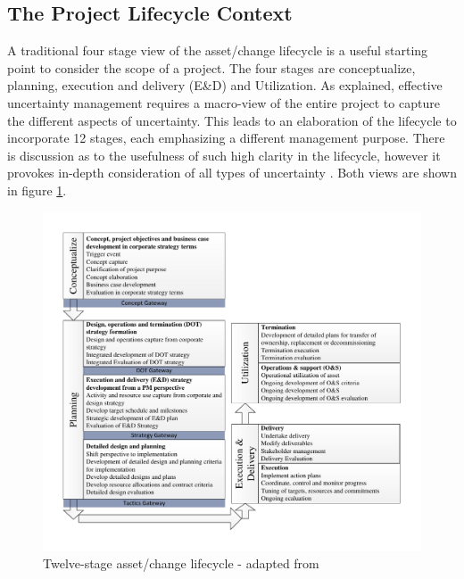 \subsection{The Project Lifecycle Context}
A traditional four stage view of the asset/change lifecycle is a useful starting point to consider the scope of a project.
The four stages are conceptualize, planning, execution and delivery (E\&D) and Utilization.
As explained, effective uncertainty management requires a macro-view of the entire project to capture the different aspects of uncertainty.
This leads to an elaboration of the lifecycle to incorporate 12 stages, each emphasizing a different management purpose.
There is discussion as to the usefulness of such high clarity in the lifecycle, however it provokes in-depth consideration of all types of uncertainty \citep{Ward1995145}.
Both views are shown in figure \ref{Figure:Project_Lifecycle}.

\begin{figure}[!h]
  \centering
    \includegraphics[width = \textwidth]{./Figures/ProjectLifecycleDetailedCurve.pdf} 
\caption{Twelve-stage asset/change lifecycle - adapted from \cite{chapman}}
\label{Figure:Project_Lifecycle}
\end{figure}

